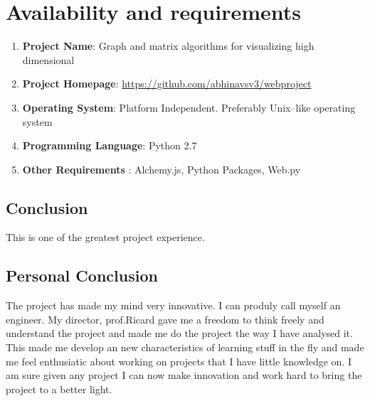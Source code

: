 \section{Availability and requirements}
\begin{enumerate}
\item \textbf{Project Name}: Graph and matrix algorithms for visualizing high dimensional
\item \textbf{Project Homepage}: \url{https://github.com/abhinavsv3/webproject}
\item \textbf{Operating System}: Platform Independent. Preferably Unix--like operating system
\item \textbf{Programming Language}: Python 2.7
\item \textbf{Other Requirements} : Alchemy.js, Python Packages, Web.py
\end{enumerate}

\subsection{Conclusion}
This is one of the greatest project experience.	
\subsection{Personal Conclusion}
The project has made my mind very innovative. I can produly call myself an engineer. My director, prof.Ricard gave me a freedom to think freely and understand the project and made me do the project the way I have analysed it.  This made me develop an new characteristics of learning stuff in the fly and made me feel enthusiatic about working on projects that I have little knowledge on. I am sure given any project I can now make innovation and work hard to bring the project to a better light.


{}




